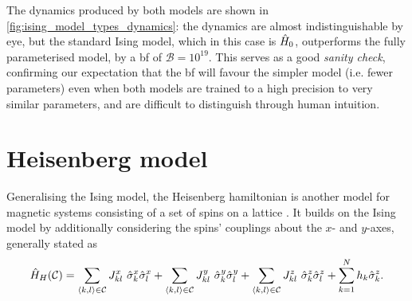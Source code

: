 The dynamics produced by both models are shown in \cref{fig:ising_model_types_dynamics}:
    the dynamics are almost indistinguishable by eye, but the standard Ising model, 
    which in this case is $\hat{H}_0$, outperforms the fully parameterised model, 
    by a \gls{bf} of $\mathcal{B} = 10^{19}$.
This serves as a good \emph{sanity check}, confirming our expectation that 
    the \gls{bf} will favour the simpler model (i.e. fewer parameters) even when both models 
    are trained to a high precision to very similar parameters, and are difficult to distinguish through human intuition\footnotemark. 

\section{Heisenberg model}\label{sec:heisenberg}
Generalising the Ising model, the Heisenberg \gls{hamiltonian} is another model for magnetic systems consisting of a set of 
    spins on a lattice \cite{greiner2012thermodynamics}. 
It builds on the Ising model by additionally considering the spins' couplings about the $x$- and $y$-axes, generally stated as 
\begin{equation}
    \label{eqn:heisenberg_model_general}
    \hat{H}_H({ \mathcal{C}}) = 
    \sum\limits_{{ \langle k, l \rangle } \in { \mathcal{C}}} J^x_{kl} \  \hat{\sigma}^x_k \hat{\sigma}^x_l
    + \sum\limits_{{ \langle k, l \rangle } \in { \mathcal{C}}} J^y_{kl} \ \hat{\sigma}^y_k \hat{\sigma}^y_l
    + \sum\limits_{{ \langle k, l \rangle } \in { \mathcal{C}}} J^z_{kl} \ \hat{\sigma}^z_k \hat{\sigma}^z_l
    + \sum\limits_{k=1}^{N} h_k \hat{\sigma}^z_k.
\end{equation}

